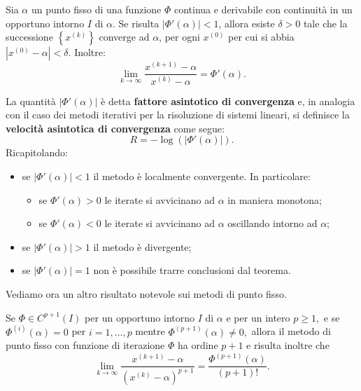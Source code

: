 \begin{theorem}
[di Ostrowski]
\label{thm:ostrowski}
Sia $\alpha $ un punto fisso di una funzione $\Phi $ continua e derivabile con continuità in un opportuno intorno $I$ di $\alpha $. Se risulta $| \Phi '(\alpha )| < 1$, allora esiste $\delta  >0$ tale che la successione $\left\{x^{(k)}\right\}$ converge ad $\alpha $, per ogni $x^{(0)}$ per cui si abbia $\left| x^{(0)} -\alpha \right| < \delta $. Inoltre:
\begin{equation*}
\lim _{k\rightarrow \infty }\frac{x^{(k+1)} -\alpha }{x^{(k)} -\alpha } =\Phi '(\alpha ).
\end{equation*}
\end{theorem}
La quantità $| \Phi '(\alpha )| $ è detta \textbf{fattore asintotico di convergenza} e, in analogia con il caso dei metodi iterativi per la risoluzione di sistemi lineari, si definisce la \textbf{velocità asintotica di convergenza} come segue:
\begin{equation*}
R=-\log(| \Phi '(\alpha )| ).
\end{equation*}
Ricapitolando:
\begin{itemize}
\item se $| \Phi '(\alpha )| < 1$ il metodo è localmente convergente. In particolare:
\begin{itemize}
\item se $\Phi '(\alpha ) >0$ le iterate si avvicinano ad $\alpha $ in maniera monotona;
\item se $\Phi '(\alpha )< 0$ le iterate si avvicinano ad $\alpha $ oscillando intorno ad $\alpha $;
\end{itemize}
\item se $| \Phi '(\alpha )|  >1$ il metodo è divergente;
\item se $| \Phi '(\alpha )| =1$ non è possibile trarre conclusioni dal teorema.
\end{itemize}
Vediamo ora un altro risultato notevole sui metodi di punto fisso.
\begin{theorem}
Se $\Phi \in C^{p+1} (I)$ per un opportuno intorno $I$ di $\alpha $ e per un intero $p\geqslant 1,$ e se $\Phi ^{(i)} (\alpha )=0$ per $i=1,\dotsc ,p$ mentre $\Phi ^{(p+1)} (\alpha )\neq 0,$ allora il metodo di punto fisso con funzione di iterazione $\Phi $ ha ordine $p+1$ e risulta inoltre che
\begin{equation*}
\lim _{k\rightarrow \infty }\frac{x^{(k+1)} -\alpha }{\left( x^{(k)} -\alpha \right)^{p+1}} =\frac{\Phi ^{(p+1)} (\alpha )}{(p+1)!}.
\end{equation*}
\end{theorem}

